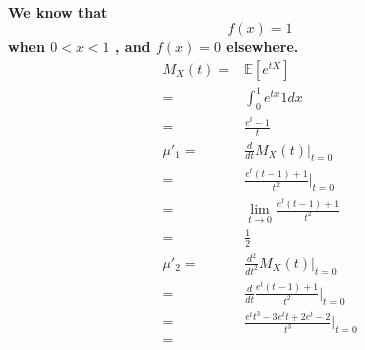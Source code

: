 \documentclass{article}
\begin{document}
        \paragraph{
            We know that
            $$f(x)=1$$ 
            when $0<x<1$
            , and $f(x)=0$ elsewhere.
            \begin{equation*}
                \begin{split}
                    M_X(t)=&\mathbb{E}[e^{tX}]\\
                        =&\int_0^1 e^{tx} 1 dx\\
                        =&\frac{e^t-1}{t}\\
                    \mu'_1=&\frac{d}{dt}M_X(t)|_{t=0}\\
                        =&\frac{e^t(t-1)+1}{t^2}|_{t=0}\\
                        =&\lim_{t\rightarrow 0}\frac{e^t(t-1)+1}{t^2}\\
                        =&\frac{1}{2}\\
                    \mu'_2=&\frac{d^2}{dt^2}M_X(t)|_{t=0}\\    
                        =&\frac{d}{dt}\frac{e^t(t-1)+1}{t^2}|_{t=0}\\
                        =&\frac{e^tt^3-3e^tt+2e^t-2}{t^3}|_{t=0}\\
                        =&\\
                \end{split}
            \end{equation*}
        }
    
    \section{}
\end{document}
